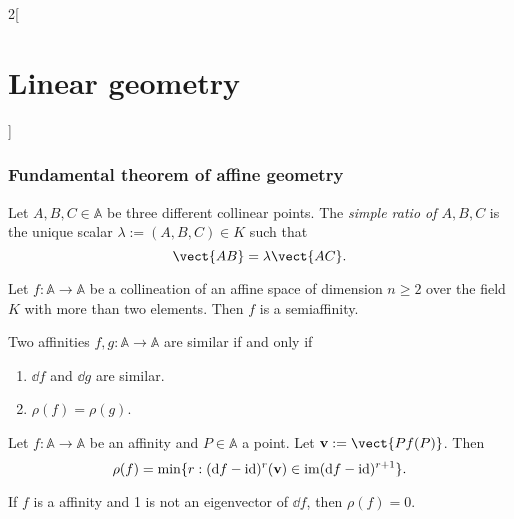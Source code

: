 \documentclass[../../../main.tex]{subfiles}
\begin{document}
\begin{multicols}{2}[\section{Linear geometry}]
  \subsubsection{Fundamental theorem of affine geometry}
  \begin{definition}
    Let $A,B,C\in\mathbb{A}$ be three different collinear points. The \textit{simple ratio of $A,B,C$} is the unique scalar $\lambda:=(A,B,C)\in K$ such that $$\vect{AB}=\lambda\vect{AC}.$$
    \begin{theorem}
      Let $f:\mathbb{A}\rightarrow\mathbb{A}$ be a collineation of an affine space of dimension $n\geq 2$ over the field $K$ with more than two elements. Then $f$ is a semiaffinity.
    \end{theorem}
    \begin{prop}
      Two affinities $f,g:\mathbb{A}\rightarrow\mathbb{A}$ are similar if and only if
      \begin{enumerate}
        \item $\dd f$ and $\dd g$ are similar.
        \item $\rho(f)=\rho(g)$.
      \end{enumerate}
    \end{prop}
    \begin{theorem}
      Let $f:\mathbb{A}\rightarrow\mathbb{A}$ be an affinity and $P\in\mathbb{A}$ a point. Let $\vectorfunction{v}:=\vect{Pf(P)}$. Then $$\rho(f)=\min\{r:(\dd f-\mathrm{id})^r(\boldsymbol{\mathrm{v}})\in\operatorname{im}(\dd f-\mathrm{id})^{r+1}\}.$$
    \end{theorem}
    \begin{corollary}
      If $f$ is a affinity and 1 is not an eigenvector of $\dd f$, then $\rho(f)=0$.
    \end{corollary}
  \end{definition}

\end{multicols}
\end{document}

